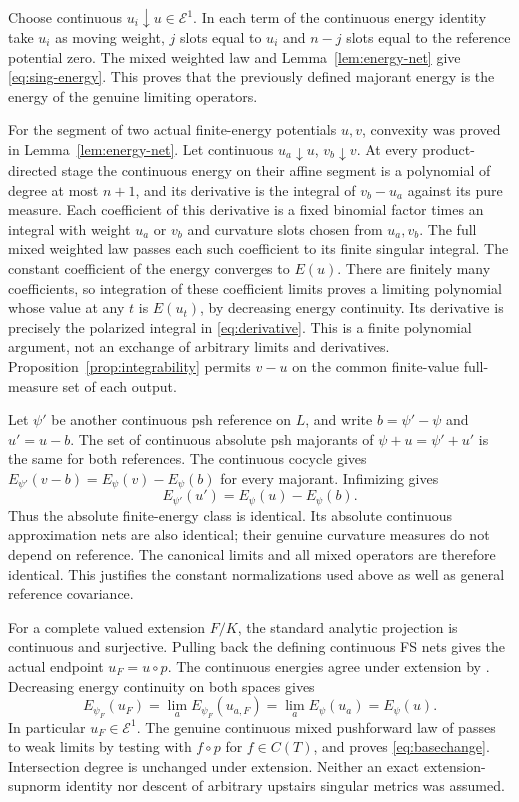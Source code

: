 \documentclass[11pt]{article}
\newcommand{\E}{\mathcal E}
\begin{document}
Choose continuous $u_i\downarrow u\in\E^1$. In each term of the
continuous energy identity take $u_i$ as moving weight, $j$ slots
equal to $u_i$ and $n-j$ slots equal to the reference potential zero.
The mixed weighted law and Lemma~\ref{lem:energy-net} give
\eqref{eq:sing-energy}. This proves that the previously defined
majorant energy is the energy of the genuine limiting operators.

For the segment of two actual finite-energy potentials $u,v$,
convexity was proved in Lemma~\ref{lem:energy-net}. Let continuous
$u_a\downarrow u$, $v_b\downarrow v$. At every product-directed
stage the continuous energy on their affine segment is a polynomial
of degree at most $n+1$, and its derivative is the integral of
$v_b-u_a$ against its pure measure. Each coefficient of this derivative
is a fixed binomial factor times an integral with weight $u_a$ or
$v_b$ and curvature slots chosen from $u_a,v_b$. The full mixed
weighted law passes each such coefficient to its finite singular
integral. The constant coefficient of the energy converges to
$E(u)$. There are finitely many coefficients, so integration of
these coefficient limits proves a limiting polynomial whose value
at any $t$ is $E(u_t)$, by decreasing energy continuity. Its derivative
is precisely the polarized integral in \eqref{eq:derivative}.
This is a finite polynomial argument, not an exchange of arbitrary
limits and derivatives. Proposition~\ref{prop:integrability} permits
$v-u$ on the common finite-value full-measure set of each output.

Let $\psi'$ be another continuous psh reference on $L$, and write
$b=\psi'-\psi$ and $u'=u-b$. The set of continuous absolute psh
majorants of $\psi+u=\psi'+u'$ is the same for both references.
The continuous cocycle gives
$E_{\psi'}(v-b)=E_\psi(v)-E_\psi(b)$ for every majorant.
Infimizing gives
\[
 E_{\psi'}(u')=E_\psi(u)-E_\psi(b).
\]
Thus the absolute finite-energy class is identical. Its absolute
continuous approximation nets are also identical; their genuine
curvature measures do not depend on reference. The canonical limits
and all mixed operators are therefore identical. This justifies the
constant normalizations used above as well as general reference
covariance.

For a complete valued extension $F/K$, the standard analytic
projection is continuous and surjective. Pulling back the defining
continuous FS nets gives the actual endpoint $u_F=u\circ p$.
The continuous energies agree under extension by
\cite[Proposition 9.14]{BE}. Decreasing energy continuity on both
spaces gives
\[
 E_{\psi_F}(u_F)=\lim_aE_{\psi_F}(u_{a,F})
              =\lim_aE_\psi(u_a)=E_\psi(u).
\]
In particular $u_F\in\E^1$. The genuine continuous mixed
pushforward law of \cite[Proposition 8.3 and Section 8.1]{BE}
passes to weak limits by testing with $f\circ p$ for $f\in C(T)$,
and proves \eqref{eq:basechange}. Intersection degree is unchanged
under extension. Neither an exact extension-supnorm identity nor
descent of arbitrary upstairs singular metrics was assumed.
\end{document}
